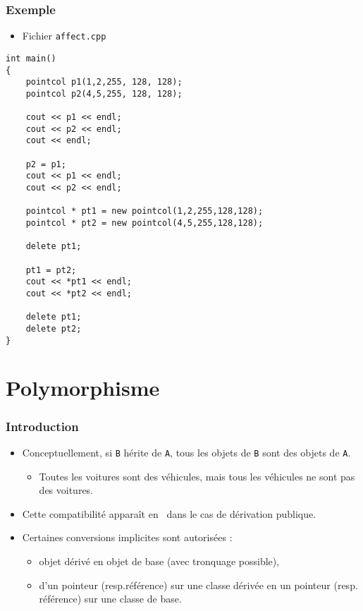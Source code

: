 \begin{frame}[containsverbatim]
\frametitle{Exemple}
\begin{itemize}
\item Fichier \texttt{affect.cpp}
\end{itemize}
\begin{lstlisting}
int main()
{
	pointcol p1(1,2,255, 128, 128);
	pointcol p2(4,5,255, 128, 128);

	cout << p1 << endl;
	cout << p2 << endl;
	cout << endl;

	p2 = p1;
	cout << p1 << endl;
	cout << p2 << endl;	

	pointcol * pt1 = new pointcol(1,2,255,128,128);
	pointcol * pt2 = new pointcol(4,5,255,128,128);

	delete pt1;

	pt1 = pt2;	
	cout << *pt1 << endl;
	cout << *pt2 << endl;

	delete pt1;
	delete pt2;
}
\end{lstlisting}
\end{frame}

\section{Polymorphisme}

\begin{frame}
\frametitle{Introduction}
\begin{itemize}[<+->]
\item Conceptuellement, si \texttt{B} hérite de \texttt{A}, tous les objets de \texttt{B} sont des objets de \texttt{A}.
	\begin{itemize}
	\item Toutes les voitures sont des véhicules, mais tous les véhicules ne sont pas des voitures.	
	\end{itemize}
\item Cette compatibilité apparaît en \cpp\ dans le cas de dérivation publique.
\item Certaines conversions implicites sont autorisées :
	\begin{itemize}
	\item objet dérivé en objet de base (avec tronquage possible),
	\item d'un pointeur (resp.référence) sur une classe dérivée en un pointeur (resp. référence) sur une classe de base.
	\end{itemize}
\end{itemize}
\end{frame}


